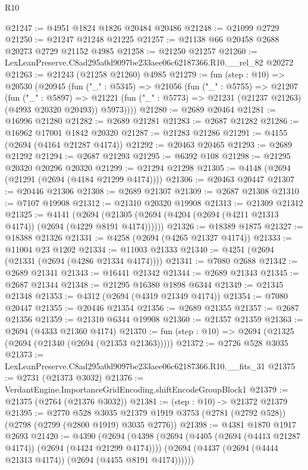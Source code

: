 \begin{lexlean}{R10}
\begin{coremodule}
@21247 := @4951 @1824 @1826 @20484 @20486
@21248 := @21099 @2729
@21250 := @21247 @21248 @21225
@21257 := @21138 @66 @20458 @2688 @20273 @2729 @21152 @4985
@21258 := @21250 @21257
@21260 := LexLeanPreserve.C8ad295a0d9097be233aee06c62187366.R10.__rel_82 @20272
@21263 := @21243 (@21258 @21260) @4985
@21279 := fun (step : @10) =>
  @20530
    (@20945
      (fun ("_" : @5345) =>
      @21056
        (fun ("_" : @5755) =>
        @21207
          (fun ("_" : @5897) =>
          @21221 (fun ("_" : @5773) => @21231 (@21237 @21263) (@4993 @20320 @20493)) @5973))))
@21280 := @2689 @20464
@21281 := @16996 @21280
@21282 := @2689 @21281
@21283 := @2687 @21282
@21286 := @16962 @17001 @1842 @20320
@21287 := @21283 @21286
@21291 := @4155 (@2694 (@4164 @21287 @4174))
@21292 := @20463 @20465
@21293 := @2689 @21292
@21294 := @2687 @21293
@21295 := @6392 @108
@21298 := @21295 @20320 @20296 @20320
@21299 := @21294 @21298
@21305 := @4148 (@2694 (@21291 (@2694 (@4184 @21299 @4174))))
@21306 := @20463 @20447
@21307 := @20446 @21306
@21308 := @2689 @21307
@21309 := @2687 @21308
@21310 := @7107 @19908
@21312 := @21310 @20320 @19908
@21313 := @21309 @21312
@21325 := @4141
    (@2694 (@21305 (@2694 (@4204 (@2694 (@4211 @21313 @4174)) (@2694 (@4229 @8191 @4174))))))
@21326 := @18389 @1875
@21327 := @18388 @21326
@21331 := @4258 (@2694 (@4265 @21327 @4174))
@21333 := @11004 @23 @1202
@21334 := @11003 @21333
@21340 := @4251 (@2694 (@21331 (@2694 (@4286 @21334 @4174))))
@21341 := @7080 @2688
@21342 := @2689 @21341
@21343 := @16441 @21342
@21344 := @2689 @21343
@21345 := @2687 @21344
@21348 := @21295 @16380 @1898 @6344
@21349 := @21345 @21348
@21353 := @4312 (@2694 (@4319 @21349 @4174))
@21354 := @7080 @20447
@21355 := @20446 @21354
@21356 := @2689 @21355
@21357 := @2687 @21356
@21359 := @21310 @6344 @19908
@21360 := @21357 @21359
@21363 := @2694 (@4333 @21360 @4174)
@21370 := fun (step : @10) => @2694 (@21325 (@2694 (@21340 (@2694 (@21353 @21363)))))
@21372 := @2726 @528 @3035
@21373 := LexLeanPreserve.C8ad295a0d9097be233aee06c62187366.R10.__fits_31
@21375 := @2731 (@21373 @3032)
@21376 := VerdantEngine.ImportanceGridEncoding.shiftEncodeGroupBlock1
@21379 := @21375 (@2764 (@21376 @3032))
@21381 := (step : @10) -> @21372 @21379
@21395 := @2770
    @528
    @3035
    @21379
    @1919
    @3753
    (@2781 (@2792 @528))
    (@2798 (@2799 (@2800 @1919) @3035 @2776))
@21398 := @4381 @1870 @1917 @2693
@21420 := @4390
    (@2694
      (@4398
        (@2694 (@4405 (@2694 (@4413 @21287 @4174)) (@2694 (@4424 @21299 @4174))))
        (@2694 (@4437 (@2694 (@4444 @21313 @4174)) (@2694 (@4455 @8191 @4174))))))

\end{coremodule}
\end{lexlean}
